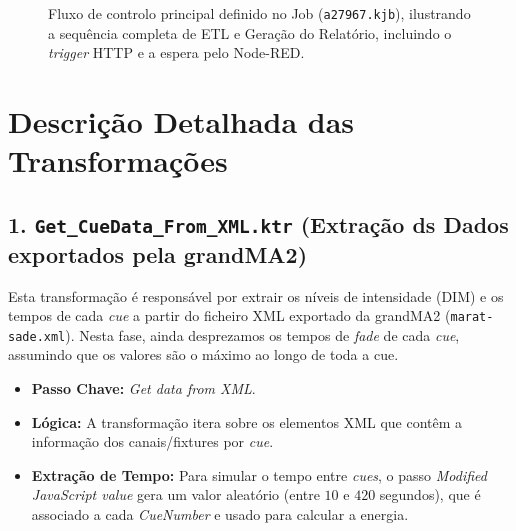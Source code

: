 \documentclass[a4paper, 12pt]{article}
\begin{document}
	\begin{figure}[h!]
		\centering
		\caption{Fluxo de controlo principal definido no Job (\texttt{a27967.kjb}), ilustrando a sequência completa de ETL e Geração do Relatório, incluindo o \textit{trigger }HTTP e a espera pelo Node-RED.}
		\label{fig:job_flow}
	\end{figure}
	
	\section{Descrição Detalhada das Transformações}
	
	\subsection{1. \texttt{Get\_CueData\_From\_XML.ktr} (Extração ds Dados exportados pela grandMA2)}
	Esta transformação é responsável por extrair os níveis de intensidade (DIM) e os tempos de cada \textit{cue} a partir do ficheiro XML exportado da grandMA2 (\texttt{marat-sade.xml}). Nesta fase, ainda desprezamos os tempos de \textit{fade} de cada \textit{cue}, assumindo que os valores são o máximo ao longo de toda a cue.
	
	\begin{itemize}
		\item \textbf{Passo Chave:} \textit{Get data from XML}.
		\item \textbf{Lógica:} A transformação itera sobre os elementos XML que contêm a informação dos canais/fixtures por \textit{cue}.
		\item \textbf{Extração de Tempo:} Para simular o tempo entre \textit{cues}, o passo \textit{Modified JavaScript value} gera um valor aleatório (entre $\text{10}$ e $\text{420}$ segundos), que é associado a cada \textit{CueNumber} e usado para calcular a energia.
	\end{itemize}
	
\end{document}
